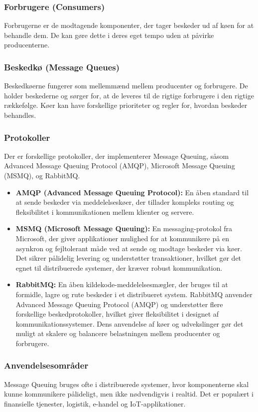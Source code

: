 \subsubsection{Forbrugere (Consumers)}
Forbrugerne er de modtagende komponenter, der tager beskeder ud af køen for at behandle dem. De kan gøre dette i deres eget tempo uden at påvirke producenterne.
\subsubsection{Beskedkø (Message Queues)}
Beskedkøerne fungerer som mellemmænd mellem producenter og forbrugere. De holder beskederne og sørger for, at de leveres til de rigtige forbrugere i den rigtige rækkefølge. Køer kan have forskellige prioriteter og regler for, hvordan beskeder behandles.
\subsubsection{Protokoller}
Der er forskellige protokoller, der implementerer Message Queuing, såsom Advanced Message Queuing Protocol (AMQP), Microsoft Message Queuing (MSMQ), og RabbitMQ.
\begin{itemize}
	\item \textbf{AMQP (Advanced Message Queuing Protocol):} En åben standard til at sende beskeder via meddelelseskøer, der tillader kompleks routing og fleksibilitet i kommunikationen mellem klienter og servere.
	\item \textbf{MSMQ (Microsoft Message Queuing):} En messaging-protokol fra Microsoft, der giver applikationer mulighed for at kommunikere på en asynkron og fejltolerant måde ved at sende og modtage beskeder via køer. Det sikrer pålidelig levering og understøtter transaktioner, hvilket gør det egnet til distribuerede systemer, der kræver robust kommunikation.
	\item \textbf{RabbitMQ:} En åben kildekode-meddelelsesmægler, der bruges til at formidle, lagre og rute beskeder i et distribueret system. RabbitMQ anvender Advanced Message Queuing Protocol (AMQP) og understøtter flere forskellige beskedprotokoller, hvilket giver fleksibilitet i designet af kommunikationssystemer. Dens anvendelse af køer og udvekslinger gør det muligt at skalere og balancere belastningen mellem producenter og forbrugere.
\end{itemize}
\subsubsection{Anvendelsesområder}
Message Queuing bruges ofte i distribuerede systemer, hvor komponenterne skal kunne kommunikere pålideligt, men ikke nødvendigvis i realtid. Det er populært i finansielle tjenester, logistik, e-handel og IoT-applikationer.
